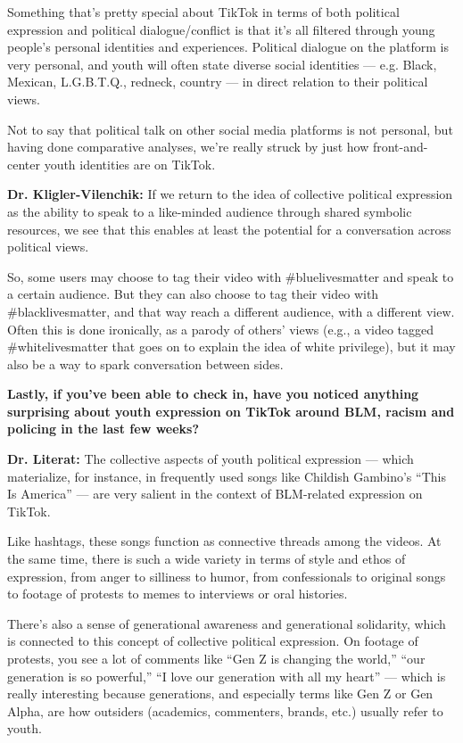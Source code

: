 Something that's pretty special about TikTok in terms of both political
expression and political dialogue/conflict is that it's all filtered
through young people's personal identities and experiences. Political
dialogue on the platform is very personal, and youth will often state
diverse social identities --- e.g. Black, Mexican, L.G.B.T.Q., redneck,
country --- in direct relation to their political views.

Not to say that political talk on other social media platforms is not
personal, but having done comparative analyses, we're really struck by
just how front-and-center youth identities are on TikTok.

\textbf{Dr. Kligler-Vilenchik:} If we return to the idea of collective
political expression as the ability to speak to a like-minded audience
through shared symbolic resources, we see that this enables at least the
potential for a conversation across political views.

So, some users may choose to tag their video with \#bluelivesmatter and
speak to a certain audience. But they can also choose to tag their video
with \#blacklivesmatter, and that way reach a different audience, with a
different view. Often this is done ironically, as a parody of others'
views (e.g., a video tagged \#whitelivesmatter that goes on to explain
the idea of white privilege), but it may also be a way to spark
conversation between sides.

\textbf{Lastly, if you've been able to check in, have you noticed
anything surprising about youth expression on TikTok around BLM, racism
and policing in the last few weeks?}

\textbf{Dr. Literat:} The collective aspects of youth political
expression --- which materialize, for instance, in frequently used songs
like Childish Gambino's ``This Is America'' --- are very salient in the
context of BLM-related expression on TikTok.

Like hashtags, these songs function as connective threads among the
videos. At the same time, there is such a wide variety in terms of style
and ethos of expression, from anger to silliness to humor, from
confessionals to original songs to footage of protests to memes to
interviews or oral histories.

There's also a sense of generational awareness and generational
solidarity, which is connected to this concept of collective political
expression. On footage of protests, you see a lot of comments like ``Gen
Z is changing the world,'' ``our generation is so powerful,'' ``I love
our generation with all my heart'' --- which is really interesting
because generations, and especially terms like Gen Z or Gen Alpha, are
how outsiders (academics, commenters, brands, etc.) usually refer to
youth.

